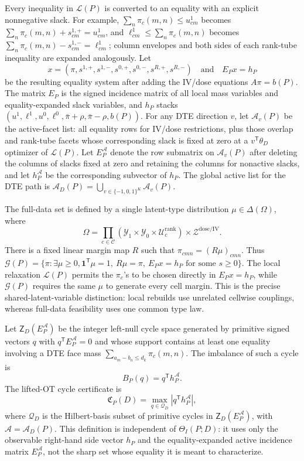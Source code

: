 \documentclass[11pt]{article}
\newcommand{\transpose}{\mathsf{T}}
\theoremstyle{definition}
\theoremstyle{plain}
\theoremstyle{remark}
\begin{document}
Every inequality in \(\mathcal L(P)\) is converted to an equality with an
explicit nonnegative slack.  For example,
\(\sum_n\pi_c(m,n)\le u^1_{cm}\) becomes
\(\sum_n\pi_c(m,n)+s^{1,+}_{cm}=u^1_{cm}\), and
\(\ell^1_{cm}\le\sum_n\pi_c(m,n)\) becomes
\(\sum_n\pi_c(m,n)-s^{1,-}_{cm}=\ell^1_{cm}\); column envelopes and both sides
of each rank-tube inequality are expanded analogously.  Let
\[
x=(\pi,s^{1,+},s^{1,-},s^{0,+},s^{0,-},s^{R,+},s^{R,-})
\quad\text{and}\quad
E_Px=h_P
\]
be the resulting equality system after adding the IV/dose equations
\(A\pi=b(P)\).  The matrix \(E_P\) is the signed incidence matrix of all local
mass variables and equality-expanded slack variables, and \(h_P\) stacks
\((u^1,\ell^1,u^0,\ell^0,\bar\pi+\rho,\bar\pi-\rho,b(P))\).
For any DTE direction \(v\), let \(\mathcal A_v(P)\) be the active-facet list:
all equality rows for IV/dose restrictions, plus those overlap and rank-tube
facets whose corresponding slack is fixed at zero at a \(v^\transpose\theta_D\)
optimizer of \(\mathcal L(P)\).  Let \(E_P^{\mathcal A}\) denote the row
submatrix on \(\mathcal A_v(P)\) after deleting the columns of slacks fixed at
zero and retaining the columns for nonactive slacks, and let
\(h_P^{\mathcal A}\) be the corresponding subvector of \(h_P\).  The global
active list for the DTE path is
\(\mathcal A_D(P)=\bigcup_{v\in\{-1,0,1\}^K}\mathcal A_v(P)\).

The full-data set is defined by a single latent-type distribution
\(\mu\in\Delta(\Omega)\), where
\[
\Omega=\prod_{c\in\mathcal C}
(\mathcal Y_1\times\mathcal Y_0\times\mathcal U_c^{\mathrm{rank}})
\times\mathcal Z^{\mathrm{dose/IV}}.
\]
There is a fixed linear margin map \(R\) such that
\(\pi_{cmn}=(R\mu)_{cmn}\).  Thus \(\mathcal G(P)=\{\pi:\exists \mu\ge0,
\mathbf 1^\transpose\mu=1,\ R\mu=\pi,\ E_Px=h_P\text{ for some }s\ge0\}\).
The local relaxation \(\mathcal L(P)\) permits the \(\pi_c\)'s to be chosen
directly in \(E_Px=h_P\), while \(\mathcal G(P)\) requires the same \(\mu\) to
generate every cell margin.  This is the precise shared-latent-variable
distinction: local rebuilds use unrelated cellwise couplings, whereas full-data
feasibility uses one common type law.

Let \(\mathsf Z_D(E_P^{\mathcal A})\) be the integer left-null cycle space
generated by primitive signed vectors \(q\) with
\(q^\transpose E_P^{\mathcal A}=0\) and whose support
contains at least one equality involving a DTE face mass
\(\sum_{a_m-b_n\le d_k}\pi_c(m,n)\).  The imbalance of such a cycle is
\[
B_P(q)=q^\transpose h_P^{\mathcal A} .
\]
The lifted-OT cycle certificate is
\[
\mathfrak C_P(D)=\max_{q\in\mathcal Q_D}|q^\transpose h_P^{\mathcal A}|,
\]
where \(\mathcal Q_D\) is the Hilbert-basis subset of primitive cycles in
\(\mathsf Z_D(E_P^{\mathcal A})\), with \(\mathcal A=\mathcal A_D(P)\).
This definition is independent of
\(\Theta_I(P;D)\): it uses only the observable right-hand side vector \(h_P\)
and the equality-expanded active incidence matrix \(E_P^{\mathcal A}\), not the
sharp set whose equality it is meant to characterize.
\end{document}
